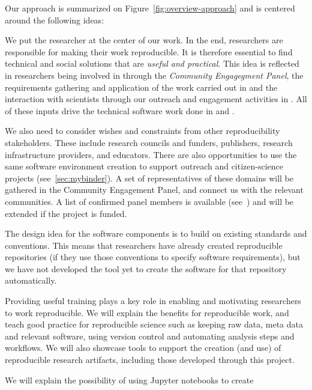 Our approach is summarized on Figure~\ref{fig:overview-approach} and is centered around the following ideas:
\begin{compactenum}
  \item We put the researcher at the center of our work. In the end,
    researchers are responsible for making their work
    reproducible. It is therefore essential to find technical and social solutions
    that are \emph{useful and practical}. This idea is reflected in researchers
    being involved in  through the \emph{Community Engagegment
    Panel}, the requirements gathering and application of the work carried out
  in  and the interaction with scientists through our
  outreach and engagement activities in . All of these inputs
  drive the technical software work done in  and .
\item We also need to consider wishes and constraints from other reproducibility
  stakeholders. These include research councils and funders, publishers, research
  infrastructure providers, and educators. There are also opportunities to use the same
  software environment creation to support outreach and
  citizen-science projects (see~\ref{sec:mybinder}). A set of representatives of
  these domains will be gathered in the Community Engagement Panel, and connect
  us with the relevant communities. A list of confirmed panel members is
  available (see~) and will be
  extended if the project is funded.
\item The design idea for the software components is to build on existing standards and
  conventions. This means that researchers have already created reproducible
  repositories (if they use those conventions to specify software requirements),
  but we have not developed the tool yet to create the software for that
  repository automatically. 
\item Providing useful training plays a key role in enabling and motivating
  researchers to work reproducible. We will explain the benefits for
  reproducible work, and teach good practice for reproducible science such as
  keeping raw data,  meta data and relevant software, using version control and
  automating analysis steps and workflows.
  We will also showcase tools to support the creation (and use) of reproducible
  research artifacts, including those developed through this project.
\item We will explain the possibility of using Jupyter notebooks to create

\end{compactenum}
